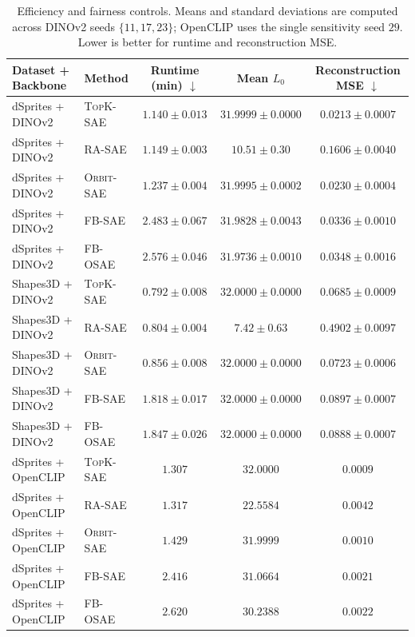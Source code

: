\documentclass[10pt,twocolumn]{article}
\newcommand{\method}[1]{\textsc{#1}}
\begin{document}
\begin{table}[t]
\caption{Efficiency and fairness controls. Means and standard deviations are computed across DINOv2 seeds $\{11,17,23\}$; OpenCLIP uses the single sensitivity seed $29$. Lower is better for runtime and reconstruction MSE.}
\label{tab:controls}
\centering
\scriptsize
\setlength{\tabcolsep}{4.5pt}
\begin{tabular}{llccc}
\toprule
Dataset + Backbone & Method & Runtime (min) $\downarrow$ & Mean $L_0$ & Reconstruction MSE $\downarrow$ \\
\midrule
dSprites + DINOv2 & \method{TopK-SAE} & $1.140 \pm 0.013$ & $31.9999 \pm 0.0000$ & $\mathbf{0.0213 \pm 0.0007}$ \\
dSprites + DINOv2 & \method{RA-SAE} & $1.149 \pm 0.003$ & $10.51 \pm 0.30$ & $0.1606 \pm 0.0040$ \\
dSprites + DINOv2 & \method{Orbit-SAE} & $1.237 \pm 0.004$ & $31.9995 \pm 0.0002$ & $0.0230 \pm 0.0004$ \\
dSprites + DINOv2 & \method{FB-SAE} & $2.483 \pm 0.067$ & $31.9828 \pm 0.0043$ & $0.0336 \pm 0.0010$ \\
dSprites + DINOv2 & \method{FB-OSAE} & $2.576 \pm 0.046$ & $31.9736 \pm 0.0010$ & $0.0348 \pm 0.0016$ \\
\midrule
Shapes3D + DINOv2 & \method{TopK-SAE} & $0.792 \pm 0.008$ & $32.0000 \pm 0.0000$ & $\mathbf{0.0685 \pm 0.0009}$ \\
Shapes3D + DINOv2 & \method{RA-SAE} & $0.804 \pm 0.004$ & $7.42 \pm 0.63$ & $0.4902 \pm 0.0097$ \\
Shapes3D + DINOv2 & \method{Orbit-SAE} & $0.856 \pm 0.008$ & $32.0000 \pm 0.0000$ & $0.0723 \pm 0.0006$ \\
Shapes3D + DINOv2 & \method{FB-SAE} & $1.818 \pm 0.017$ & $32.0000 \pm 0.0000$ & $0.0897 \pm 0.0007$ \\
Shapes3D + DINOv2 & \method{FB-OSAE} & $1.847 \pm 0.026$ & $32.0000 \pm 0.0000$ & $0.0888 \pm 0.0007$ \\
\midrule
dSprites + OpenCLIP & \method{TopK-SAE} & $1.307$ & $32.0000$ & $\mathbf{0.0009}$ \\
dSprites + OpenCLIP & \method{RA-SAE} & $1.317$ & $22.5584$ & $0.0042$ \\
dSprites + OpenCLIP & \method{Orbit-SAE} & $1.429$ & $31.9999$ & $0.0010$ \\
dSprites + OpenCLIP & \method{FB-SAE} & $2.416$ & $31.0664$ & $0.0021$ \\
dSprites + OpenCLIP & \method{FB-OSAE} & $2.620$ & $30.2388$ & $0.0022$ \\
\bottomrule
\end{tabular}
\end{table}
\end{document}
